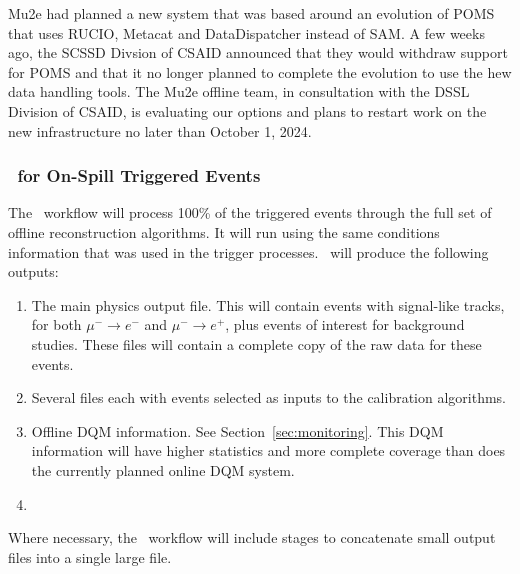 Mu2e had planned a new system that was based around an evolution of POMS that uses RUCIO, Metacat and DataDispatcher instead of SAM.   A few weeks ago, the SCSSD Divsion of CSAID announced that they would withdraw support for POMS and that it no longer planned to complete the evolution to use the hew data handling tools.  The Mu2e offline team, in consultation with the DSSL Division of CSAID, is evaluating our options and plans to restart work on the new infrastructure no later than October 1, 2024.

\subsubsection{\passone\ for On-Spill Triggered Events}
\label{ssec:pass1:onspilltriggered}




The \passone\ workflow will process 100\% of the triggered events through the full set of offline reconstruction algorithms. 
It will run using the same conditions information that was used in the trigger processes.
\passone\ will produce the following outputs:
\begin{enumerate}
    \item The main physics output file.  This will contain events with signal-like tracks, for both
           $\mu^-\to e^-$ and $\mu^-\to e^+$, plus events of interest for background studies.
           These files will contain a complete copy of the raw data for these events.
    \item Several files each with events selected as inputs to the calibration algorithms.
    \item Offline DQM information. See Section~\ref{sec:monitoring}.  This DQM information will have higher statistics and more complete coverage than does the currently planned online DQM system.
    \item {}
\end{enumerate}
Where necessary, the \passone\ workflow will include stages to concatenate small output files into a single large file.

